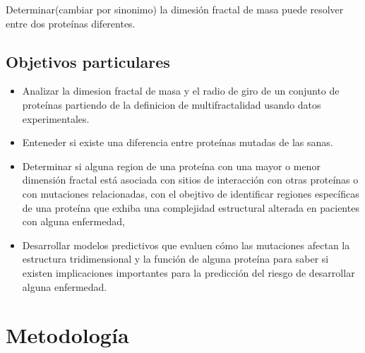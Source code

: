 \documentclass[11pt]{article}
\begin{document}
Determinar(cambiar por sinonimo) la dimesión fractal de masa puede resolver entre dos proteínas diferentes.
\subsection{Objetivos particulares}

\begin{itemize}

\item Analizar la dimesion fractal de masa y el radio de giro de un conjunto de proteínas partiendo de la definicion de multifractalidad usando datos experimentales.


\item Enteneder si existe una diferencia entre proteínas mutadas de las sanas.

\item Determinar si alguna region de una proteína con una mayor o menor dimensión fractal está asociada con sitios de interacción con otras proteínas o con mutaciones relacionadas, con el obejtivo de identificar regiones específicas de una proteína que exhiba una complejidad estructural alterada en pacientes con  alguna enfermedad, 

\item Desarrollar modelos predictivos que evaluen cómo las mutaciones  afectan la estructura tridimensional y la función de alguna proteína  para saber si existen implicaciones importantes para la predicción del riesgo de desarrollar alguna enfermedad.

\end{itemize}

\clearpage

\section{Metodología}
\end{document}
